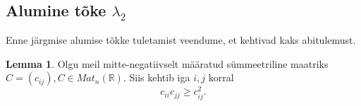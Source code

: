 \documentclass[a4paper,12pt,oneside]{article}
\newcounter{lemma}[section]
\numberwithin{equation}{section}
\theoremstyle{definition}
\newtheorem{ii_times_jj}[lemma]{Lemma}
\begin{document}
\subsection{Alumine tõke $\lambda_2$}

Enne järgmise alumise tõkke tuletamist veendume, et kehtivad kaks abitulemust.

\vspace{10pt}

\begin{ii_times_jj}
Olgu meil mitte-negatiivselt määratud s\"ummeetriline maatriks \linebreak
$C =(c_{ij}), C \in Mat_{n}(\mathbb{R})$. Siis kehtib iga $i,j$ korral
\begin{equation*}
c_{ii}c_{jj} \geq c_{ij}^2 \text{.}
\end{equation*}
\end{ii_times_jj}
\end{document}
